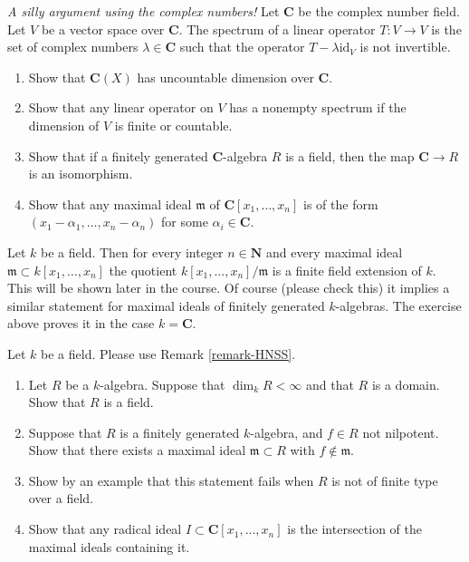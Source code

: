 \begin{exercise}
\label{exercise-uncountable}
{\it A silly argument using the complex numbers!}
Let ${\mathbf C}$ be the complex number field. Let $V$ be a vector
space over ${\mathbf C}$. The spectrum of a linear operator
$T : V \to V$ is the set of complex numbers $\lambda \in {\mathbf C}$
such that the operator $T - \lambda \text{id}_V$ is not invertible.
\begin{enumerate}
\item Show that $\mathbf{C}(X)$
has uncountable dimension over ${\mathbf C}$.
\item Show that any linear operator on $V$ has a
nonempty spectrum if the dimension of $V$ is finite or
countable.
\item Show that if a finitely generated ${\mathbf C}$-algebra
$R$ is a field, then the map ${\mathbf C}\to R$ is an isomorphism.
\item Show that any maximal ideal ${\mathfrak m}$ of
${\mathbf C}[x_1, \ldots, x_n]$ is of the form
$(x_1-\alpha_1, \ldots, x_n-\alpha_n)$ for some $\alpha_i \in {\mathbf C}$.
\end{enumerate}
\end{exercise}

\begin{remark}
\label{remark-HNSS}
Let $k$ be a field. Then for every integer $n\in {\mathbf N}$ and
every maximal ideal ${\mathfrak m} \subset k[x_1, \ldots, x_n]$
the quotient $k[x_1, \ldots, x_n]/{\mathfrak m}$ is a finite field
extension of $k$. This will be shown later in the course. Of course
(please check this) it implies a similar statement for maximal ideals
of finitely generated $k$-algebras. The exercise above proves
it in the case $k = {\mathbf C}$.
\end{remark}

\begin{exercise}
\label{exercise-Hilbert-Nullstellensatz}
Let $k$ be a field. Please use Remark \ref{remark-HNSS}.
\begin{enumerate}
\item Let $R$ be a $k$-algebra. Suppose that $\dim_k R < \infty$
and that $R$ is a domain. Show that $R$ is a field.
\item Suppose that $R$ is a finitely generated $k$-algebra, and
$f\in R$ not nilpotent. Show that there exists a maximal ideal
${\mathfrak m} \subset R$ with $f\not\in {\mathfrak m}$.
\item Show by an example that this statement fails when $R$
is not of finite type over a field.
\item Show that any radical ideal $I \subset {\mathbf C}[x_1, \ldots, x_n]$
is the intersection of the maximal ideals containing it.
\end{enumerate}
\end{exercise}

